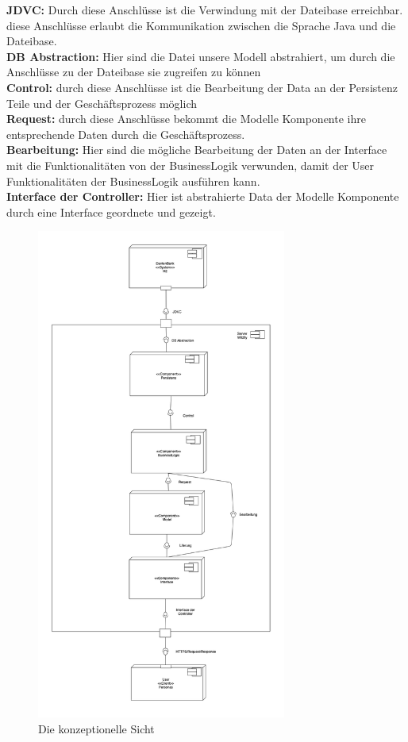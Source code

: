 \documentclass[enabledeprecatedfontcommands,fontsize=12pt,paper=a4,twoside]{scrartcl}
\begin{document}
\textbf{JDVC:} Durch diese Anschlüsse  ist die Verwindung mit der Dateibase erreichbar. diese Anschlüsse erlaubt die Kommunikation zwischen die Sprache Java und die Dateibase.  \\
\textbf{DB Abstraction:} Hier sind die Datei unsere Modell abstrahiert, um durch die Anschlüsse zu der Dateibase sie zugreifen zu können \\
\textbf{Control:} durch diese Anschlüsse ist die Bearbeitung der Data an der Persistenz Teile und der Geschäftsprozess möglich  \\
\textbf{Request:} durch diese Anschlüsse bekommt die Modelle Komponente ihre entsprechende Daten durch die Geschäftsprozess.\\
\textbf{Bearbeitung:} Hier sind die mögliche Bearbeitung der Daten an der Interface mit die Funktionalitäten von der BusinessLogik verwunden, damit der User Funktionalitäten der BusinessLogik ausführen kann. \\ 
\textbf{Interface der Controller:} Hier ist  abstrahierte  Data  der Modelle Komponente  durch eine Interface geordnete und gezeigt.\\
\begin{figure}[H]
  \includegraphics[width=310px]{UML/KonzeptioneleSicht.png}
  \caption{Die konzeptionelle Sicht}
  \label{fig:boat1}
\end{figure}
 
\end{document}
